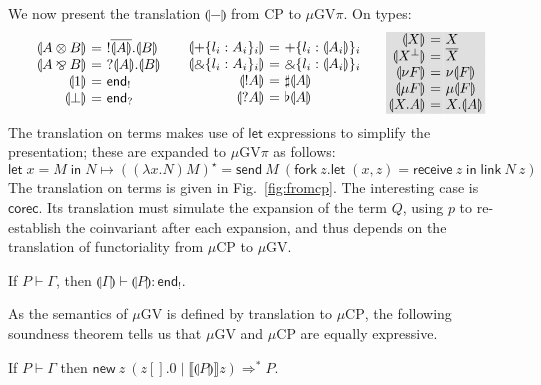 \documentclass[orivec,envcountsame]{llncs}
\makeatletter
\newcommand{\with}{\mathbin\binampersand}
\newcommand{\parr}{\mathbin\bindnasrepma}
\newcommand{\cpdual}[1]{#1^\perp}
\newcommand{\cpbang}[1]{{! #1}}
\newcommand{\cpquery}[1]{{? #1}}
\newcommand{\gvdual}[1]{\overline{#1}}
\newcommand{\gvout}[2]{{!#1.#2}}
\newcommand{\gvin}[2]{{?#1.#2}}
\newcommand{\outterm}{\mkwd{end}_!}
\newcommand{\interm}{\mkwd{end}_?}
\newcommand{\gvserver}[1]{\flat #1}
\newcommand{\gvservice}[1]{\sharp #1}
\newcommand{\cptyp}[2]{#1 \vdash #2}
\newcommand{\gvtyp}[3]{#1 \vdash #2 : #3}
\newcommand{\mkwd}[1]{\mathsf{#1}}
\newcommand{\cut}[4]{\mkwd{new}\:#1 \: (#3 \mid #4)}
\newcommand{\gvsend}[2]{\mkwd{send}\:#1\:#2}
\newcommand{\gvreceive}[1]{\mkwd{receive}\:#1}
\newcommand{\gvlet}[3]{\mkwd{let}\;#1 = #2\;\mkwd{in}\;#3}
\newcommand{\gvlink}[2]{\mkwd{link}\:#1\:#2}
\newcommand{\gvfork}[2]{\mkwd{fork}\:#1.#2}
\newcommand{\gvreceivek}[4]{\gvlet{({#1}, {#2})}{\gvreceive{#3}}{#4}}
\newcommand{\key}{\mkwd}
\newcommand{\tocp}[1]{\llbracket #1 \rrbracket}
\newcommand{\togv}[1]{\llparenthesis #1 \rrparenthesis}
\newcommand{\topi}[1]{({#1})^\star}
\newcommand{\mucp}{$\mu\mathrm{CP}$\xspace}
\newcommand{\mugv}{$\mu\mathrm{GV}$\xspace}
\newcommand{\gvpi}{$\mu\mathrm{GV}\pi$\xspace}
\newcommand{\ba}{\begin{array}}
\newcommand{\ea}{\end{array}}
\newenvironment{eqs}{\ba{@{}r@{~}c@{~}l@{}}}{\ea}
\newcommand\shaderow{\noalign{\vskip-0.4pt}\rowcolor{shade}[0.6mm]}
\makeatother
\begin{document}
We now present the translation $\togv{-}$ from CP to \gvpi. On types:
\small\[
\ba{@{}c@{\qquad}c@{\qquad}c@{}}
\begin{eqs}
\togv{A \otimes B} &=& \gvout{\gvdual{\togv{A}}}{\togv{B}} \\
\togv{A \parr B}   &=& \gvin{\togv{A}}{\togv{B}} \\
\togv{1}           &=& \outterm \\
\togv{\bot}        &=& \interm \\
\end{eqs}
&
\begin{eqs}
\togv{+\{l_i:A_i\}_i}     &=& +\{l_i:\togv{A_i}\}_i  \\
\togv{\with\{l_i:A_i\}_i} &=& \with\{l_i:\togv{A_i}\}_i \\
\togv{\cpbang{A}}   &=& \gvservice{\togv{A}} \\
\togv{\cpquery{A}}  &=& \gvserver{\togv{A}} \\
\end{eqs}
&
\begin{eqs}\shaderow
\togv{X}           &=& X \\ \shaderow
\togv{\cpdual{X}}  &=& \gvdual{X} \\ \shaderow
\togv{\nu F} &=& \nu \togv{F} \\ \shaderow
\togv{\mu F} &=& \mu \togv{F} \\ \shaderow
\togv{X.A} &=& X.\togv{A} \\
\end{eqs}
\ea
\]\normalsize
The translation on terms makes use of $\key{let}$ expressions to simplify the presentation; these
are expanded to \gvpi as follows:
\small\[
\gvlet{x}{M}{N} \mapsto
  \topi{(\lambda x.N) M} =
  \gvsend{M}{(\gvfork{z}{\gvreceivek{x}{z}{z}{\gvlink{N}{z}}})}
\]\normalsize%
The translation on terms is given in Fig.~\ref{fig:fromcp}. The interesting case is
$\key{corec}$. Its translation must simulate the expansion of the term $Q$, using $p$ to
re-establish the coinvariant after each expansion, and thus depends on the translation of
functoriality from \mucp to \mugv.

\begin{theorem}
  If $\cptyp{P}{\Gamma}$, then $\gvtyp{\togv{\Gamma}}{\togv{P}}{\outterm}$.
\end{theorem}
%
%
As the semantics of \mugv is defined by translation to \mucp, the following soundness theorem tells
us that \mugv and \mucp are equally expressive.
\begin{theorem}
\label{th:soundness}
If $\cptyp{P}{\Gamma}$ then $\cut{z}{}{z[].0}{\tocp{\togv{P}}z} \Longrightarrow^* P$.
\end{theorem}
%
\end{document}
